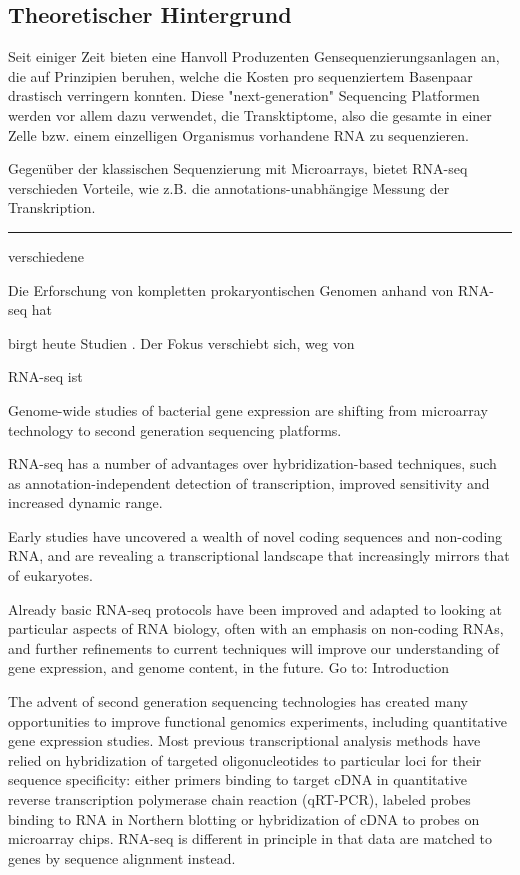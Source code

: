 \documentclass[a4paper]{thesis}
\begin{document}
\subsection{Theoretischer Hintergrund}


Seit einiger Zeit bieten eine Hanvoll Produzenten Gensequenzierungsanlagen an,
die auf Prinzipien beruhen, welche die Kosten pro sequenziertem Basenpaar
drastisch verringern konnten. Diese "next-generation" Sequencing Platformen
werden vor allem  dazu verwendet, die Transktiptome,
also die gesamte in einer Zelle bzw. einem einzelligen Organismus vorhandene RNA
zu sequenzieren.

Gegenüber der klassischen Sequenzierung mit Microarrays, bietet RNA-seq
verschieden Vorteile, wie z.B. die annotations-unabhängige Messung der
Transkription.


\hrule

verschiedene

Die Erforschung von kompletten prokaryontischen Genomen anhand von RNA-seq hat

 birgt
heute 
Studien . Der Fokus verschiebt sich, weg von


RNA-seq ist 

Genome-wide studies of bacterial gene expression are shifting from microarray technology to second generation sequencing platforms.

 RNA-seq has a number of advantages over hybridization-based techniques, such as annotation-independent detection of transcription, improved sensitivity and increased dynamic range.

 Early studies have uncovered a wealth of novel coding sequences and non-coding RNA, and are revealing a transcriptional landscape that increasingly mirrors that of eukaryotes.

 Already basic RNA-seq protocols have been improved and adapted to looking at particular aspects of RNA biology, often with an emphasis on non-coding RNAs, and further refinements to current techniques will improve our understanding of gene expression, and genome content, in the future.
Go to:
Introduction

The advent of second generation sequencing technologies has created many opportunities to improve functional genomics experiments, including quantitative gene expression studies. Most previous transcriptional analysis methods have relied on hybridization of targeted oligonucleotides to particular loci for their sequence specificity: either primers binding to target cDNA in quantitative reverse transcription polymerase chain reaction (qRT-PCR), labeled probes binding to RNA in Northern blotting or hybridization of cDNA to probes on microarray chips. RNA-seq is different in principle in that data are matched to genes by sequence alignment instead.
\end{document}
